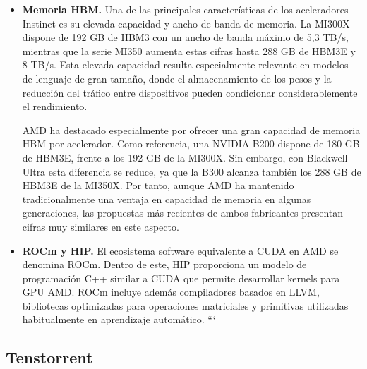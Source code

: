 \begin{itemize}
Este enfoque basado en \textit{chiplets}, utilizado también por AMD en sus procesadores Ryzen, permite ensamblar dispositivos de gran tamaño a partir de varios dados de menor superficie. Esto puede mejorar el rendimiento de fabricación, ya que un defecto localizado afecta únicamente a uno de los chiplets y no necesariamente al dispositivo completo. Como contrapartida, la comunicación entre chiplets introduce una latencia y un coste energético superiores a los de la comunicación dentro de un mismo dado, por lo que el diseño de la interconexión resulta especialmente importante para mantener un elevado rendimiento.

\item \textbf{Memoria HBM.}
Una de las principales características de los aceleradores Instinct es su elevada capacidad y ancho de banda de memoria. La MI300X dispone de 192 GB de HBM3 con un ancho de banda máximo de 5,3 TB/s, mientras que la serie MI350 aumenta estas cifras hasta 288 GB de HBM3E y 8 TB/s. Esta elevada capacidad resulta especialmente relevante en modelos de lenguaje de gran tamaño, donde el almacenamiento de los pesos y la reducción del tráfico entre dispositivos pueden condicionar considerablemente el rendimiento.

AMD ha destacado especialmente por ofrecer una gran capacidad de memoria HBM por acelerador. Como referencia, una NVIDIA B200 dispone de 180 GB de HBM3E, frente a los 192 GB de la MI300X. Sin embargo, con Blackwell Ultra esta diferencia se reduce, ya que la B300 alcanza también los 288 GB de HBM3E de la MI350X. Por tanto, aunque AMD ha mantenido tradicionalmente una ventaja en capacidad de memoria en algunas generaciones, las propuestas más recientes de ambos fabricantes presentan cifras muy similares en este aspecto.

\item \textbf{ROCm y HIP.}
El ecosistema software equivalente a CUDA en AMD se denomina ROCm. Dentro de este, HIP proporciona un modelo de programación C++ similar a CUDA que permite desarrollar kernels para GPU AMD. ROCm incluye además compiladores basados en LLVM, bibliotecas optimizadas para operaciones matriciales y primitivas utilizadas habitualmente en aprendizaje automático.
```

\end{itemize}

\subsection{Tenstorrent}

